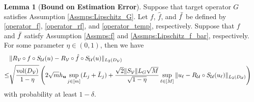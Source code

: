 \documentclass[11pt,twoside]{article}
\theoremstyle{plain}
\theoremstyle{definition}
\newtheorem{lemma}{Lemma}[section]
\theoremstyle{remark}
\newcommand{\ub}{\mathbf{u}}
\newcommand{\Uc}{\mathcal{U}}
\newcommand{\Vc}{\mathcal{V}}
\newcommand{\vol}{\mathop{\mathrm{vol}}}
\begin{document}
\begin{lemma}[{\bf Bound on Estimation Error}]
\label{operator_lemma2}
Suppose that target operator $G$ satisfies Assumption \ref{Assmps:Lipschitz_G}. Let $f$, $\hat{f}$, and $\Bar{f}$ be defined by \eqref{operator_f}, \eqref{operator_rf}, and  \eqref{operator_temp}, respectively. Suppose that $f$ and $\Bar{f}$ satisfy Assumption \ref{Assmps:f} and \ref{Assmps:Lipschitz_f_bar}, respectively. For some parameter $\eta\in(0,1)$, then we have
\begin{equation*}
\begin{aligned}
& \|R_\Vc \circ f \circ S_\Uc(u) - R_\Vc \circ \Hat{f} \circ S_\Uc(u) \|_{L_2(D_\Vc)} \\
\leq & \sqrt{\frac{\vol(D_\Vc)}{1-\eta}} \left( 2\sqrt{m}h_\ub\sup_{j\in[m]}(L_j+\Bar{L}_j) + \frac{\sqrt{2}\|S_\Vc\| L_G\sqrt{M}}{\sqrt{1-\eta}} \sup_{\ell\in[M]}\| u_\ell - R_\Uc\circ S_\Uc(u_\ell)\|_{L_2(D_\Uc)} \right)
\end{aligned}
\end{equation*}
with probability at least $1-\delta$. 
\end{lemma}
\end{document}
